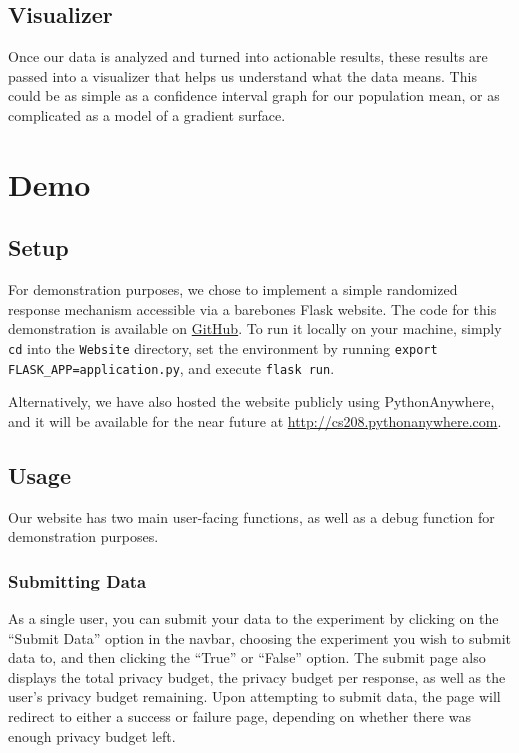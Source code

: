 \documentclass[12pt]{article}
\theoremstyle{definition}
\def\cl{\lstinline}
\begin{document}
\subsection{Visualizer}

\noindent

Once our data is analyzed and turned into actionable results, these results are passed into a visualizer that helps us understand what the data means. This could be as simple as a confidence interval graph for our population mean, or as complicated as a model of a gradient surface.

\section{Demo}

\subsection{Setup}

\noindent

For demonstration purposes, we chose to implement a simple randomized response mechanism accessible via a barebones Flask website. The code for this demonstration is available on \href{https://github.com/andrew-shackelford/CS-208-Final-Project/tree/master/Website}{GitHub}. To run it locally on your machine, simply \cl{cd} into the \cl{Website} directory, set the environment by running \cl{export FLASK_APP=application.py}, and execute \cl{flask run}.

\bigskip

Alternatively, we have also hosted the website publicly using PythonAnywhere, and it will be available for the near future at \href{http://cs208.pythonanywhere.com}{http://cs208.pythonanywhere.com}.

\subsection{Usage}

\noindent

Our website has two main user-facing functions, as well as a debug function for demonstration purposes.

\subsubsection{Submitting Data}

\noindent

As a single user, you can submit your data to the experiment by clicking on the ``Submit Data'' option in the navbar, choosing the experiment you wish to submit data to, and then clicking the ``True'' or ``False'' option. The submit page also displays the total privacy budget, the privacy budget per response, as well as the user's privacy budget remaining. Upon attempting to submit data, the page will redirect to either a success or failure page, depending on whether there was enough privacy budget left.
\end{document}
